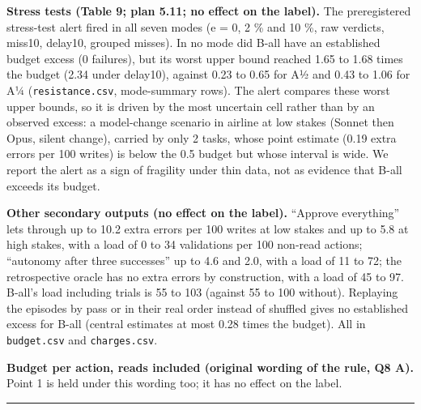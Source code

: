 \textbf{Stress tests (Table 9; plan 5.11; no effect on the label).} The preregistered stress-test alert fired in all seven modes (e = 0, 2 \% and 10 \%, raw verdicts, miss10, delay10, grouped misses). In no mode did B-all have an established budget excess (0 failures), but its worst upper bound reached 1.65 to 1.68 times the budget (2.34 under delay10), against 0.23 to 0.65 for A½ and 0.43 to 1.06 for A¼ (\texttt{resistance.\allowbreak{}csv}, mode-summary rows). The alert compares these worst upper bounds, so it is driven by the most uncertain cell rather than by an observed excess: a model-change scenario in airline at low stakes (Sonnet then Opus, silent change), carried by only 2 tasks, whose point estimate (0.19 extra errors per 100 writes) is below the 0.5 budget but whose interval is wide. We report the alert as a sign of fragility under thin data, not as evidence that B-all exceeds its budget.

\textbf{Other secondary outputs (no effect on the label).} ``Approve everything'' lets through up to 10.2 extra errors per 100 writes at low stakes and up to 5.8 at high stakes, with a load of 0 to 34 validations per 100 non-read actions; ``autonomy after three successes'' up to 4.6 and 2.0, with a load of 11 to 72; the retrospective oracle has no extra errors by construction, with a load of 45 to 97. B-all's load including trials is 55 to 103 (against 55 to 100 without). Replaying the episodes by pass or in their real order instead of shuffled gives no established excess for B-all (central estimates at most 0.28 times the budget). All in \texttt{budget.\allowbreak{}csv} and \texttt{charges.\allowbreak{}csv}.

\textbf{Budget per action, reads included (original wording of the rule, Q8 A).} Point 1 is held under this wording too; it has no effect on the label.

\begin{center}\rule{0.5\linewidth}{0.5pt}\end{center}
